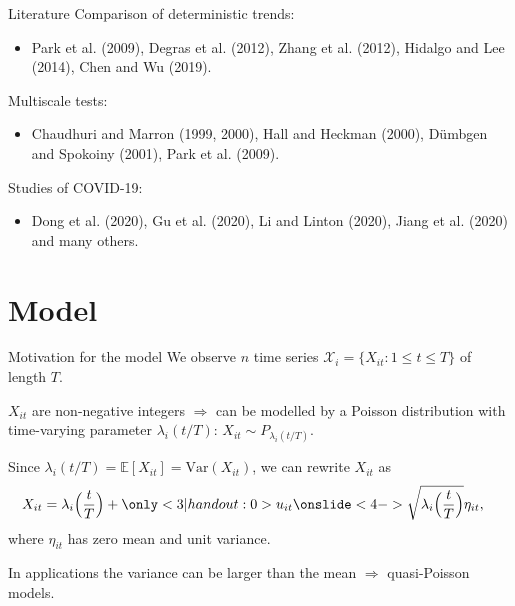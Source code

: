 \documentclass[10pt]{beamer}
\newcommand{\E}{\mathbb{E}}
\newcommand{\Var}{\mathrm{Var}}
\begin{document}
\begin{frame}{Literature}
	Comparison of deterministic trends:
	\begin{itemize}
		\item {Park et al. (2009)}, Degras et al. (2012), Zhang et al. (2012), Hidalgo and Lee (2014), Chen and Wu (2019).
	\end{itemize}\pause\pause
	Multiscale tests:
	\begin{itemize}
		\item Chaudhuri and Marron (1999, 2000), Hall and Heckman (2000), D{\"u}mbgen and Spokoiny (2001), {Park et al. (2009)}.
	\end{itemize}\pause\pause
	Studies of COVID-19:
	\begin{itemize}
		\item Dong et al. (2020), Gu et al. (2020), Li and Linton (2020), Jiang et al. (2020) and many others.
	\end{itemize}
\end{frame}


\section{Model}
\begin{frame}{Motivation for the model}
We observe $n$ time series $\mathcal{X}_i = \{X_{it}: 1 \le t \le T \}$ of length $T$.\pause

\vspace{3mm}

$X_{it}$ are non-negative integers $\Rightarrow$ can be modelled by a Poisson distribution with time-varying parameter $\lambda_i(t/T)$: $X_{it} \sim P_{\lambda_i(t/T)}$.\pause
\vspace{3mm}

Since $\lambda_i(t/T) = \E[X_{it}] = \Var(X_{it})$, we can rewrite $X_{it}$ as
\vspace{-2mm}
\begin{align*}
X_{it} &= \lambda_i\Big(\frac{t}{T}\Big) + \only<3 | handout: 0 >{u_{it} }\onslide<4->{\sqrt{\lambda_i\Big(\frac{t}{T}\Big)} \eta_{it},}
\end{align*}
where $\eta_{it}$ has zero mean and unit variance.

\vspace{3mm}

In applications the variance can be larger than the mean $\Rightarrow$ quasi-Poisson models.
\end{frame}
\end{document}

